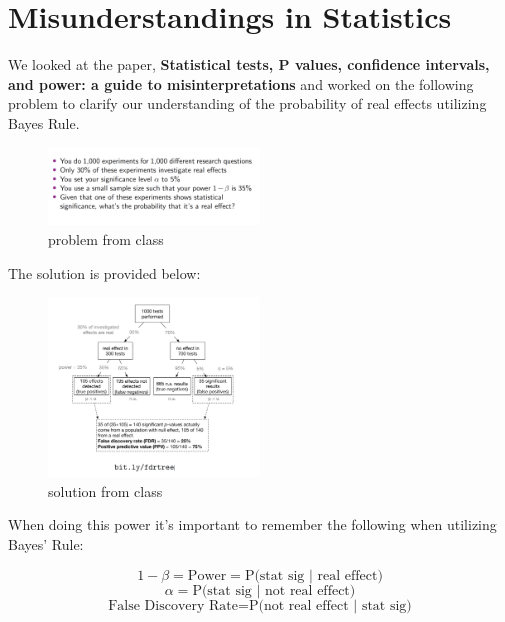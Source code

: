 \section{Misunderstandings in Statistics}

We looked at the paper, \textbf{Statistical tests, P values, confidence intervals, and power: a guide to misinterpretations} and worked on the following problem to clarify our understanding of the probability of real effects utilizing Bayes Rule. 

\begin{figure}[ht]
  \begin{center}
    \includegraphics[width=0.5\textwidth]{figures/bayes_problem.png}
    \caption{
       problem from class}
    \label{fig:bayes_problem}
  \end{center}
\end{figure}

The solution is provided below:

\begin{figure}[ht]
  \begin{center}
    \includegraphics[width=0.5\textwidth]{figures/bayes_solution.png}
    \caption{
       solution from class}
    \label{fig:bayes_solution}
  \end{center}
\end{figure}

When doing this power it's important to remember the following when utilizing Bayes' Rule:

$$ 1 - \beta = \textrm{Power} = \textrm{P(stat sig | real effect)}$$
$$ \alpha = \textrm{P(stat sig | not real effect)}$$
$$ \textrm{False Discovery Rate} = \textrm{P(not real effect | stat sig)}$$

